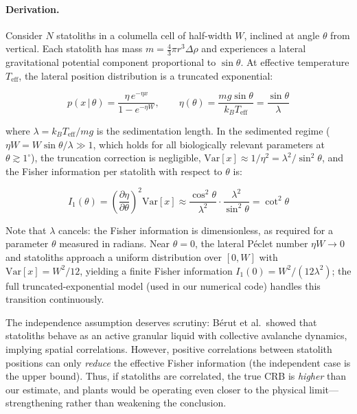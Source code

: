 \paragraph{Derivation.} Consider $N$ statoliths in a columella cell of half-width $W$, inclined at angle $\theta$ from vertical. Each statolith has mass $m = \frac{4}{3}\pi r^3 \Delta\rho$ and experiences a lateral gravitational potential component proportional to $\sin\theta$. At effective temperature $T_\text{eff}$, the lateral position distribution is a truncated exponential:

\begin{equation}
    p(x \,|\, \theta) = \frac{\eta \, e^{-\eta x}}{1 - e^{-\eta W}}, \qquad \eta(\theta) = \frac{mg\sin\theta}{k_B T_\text{eff}} = \frac{\sin\theta}{\lambda}
\label{eq:crb_distribution}
\end{equation}

\noindent where $\lambda = k_B T_\text{eff} / mg$ is the sedimentation length. In the sedimented regime ($\eta W = W\sin\theta/\lambda \gg 1$, which holds for all biologically relevant parameters at $\theta \gtrsim 1^\circ$), the truncation correction is negligible, $\text{Var}[x] \approx 1/\eta^2 = \lambda^2/\sin^2\theta$, and the Fisher information per statolith with respect to $\theta$ is:

\begin{equation}
    I_1(\theta) = \left(\frac{\partial \eta}{\partial \theta}\right)^2 \text{Var}[x] \approx \frac{\cos^2\theta}{\lambda^2} \cdot \frac{\lambda^2}{\sin^2\theta} = \cot^2\theta
\end{equation}

\noindent Note that $\lambda$ cancels: the Fisher information is dimensionless, as required for a parameter $\theta$ measured in radians. Near $\theta = 0$, the lateral P\'{e}clet number $\eta W \to 0$ and statoliths approach a uniform distribution over $[0, W]$ with $\text{Var}[x] = W^2/12$, yielding a finite Fisher information $I_1(0) = W^2/(12\lambda^2)$; the full truncated-exponential model (used in our numerical code) handles this transition continuously.

The independence assumption deserves scrutiny: B\'{e}rut et al.\ showed that statoliths behave as an active granular liquid with collective avalanche dynamics, implying spatial correlations. However, positive correlations between statolith positions can only \emph{reduce} the effective Fisher information (the independent case is the upper bound). Thus, if statoliths are correlated, the true CRB is \emph{higher} than our estimate, and plants would be operating even closer to the physical limit---strengthening rather than weakening the conclusion.

